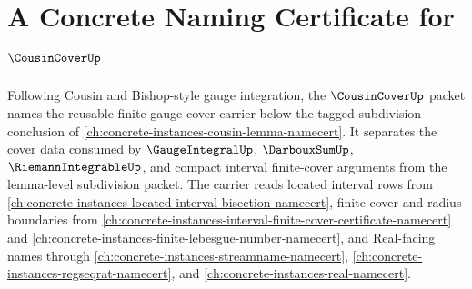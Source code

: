 \chapter{A Concrete Naming Certificate for $\CousinCoverUp$}
\label{ch:concrete-instances-cousin-cover-namecert}

Following Cousin and Bishop-style gauge integration, the $\CousinCoverUp$ packet names the reusable finite gauge-cover carrier below the tagged-subdivision conclusion of \autoref{ch:concrete-instances-cousin-lemma-namecert}. It separates the cover data consumed by $\GaugeIntegralUp$, $\DarbouxSumUp$, $\RiemannIntegrableUp$, and compact interval finite-cover arguments from the lemma-level subdivision packet. The carrier reads located interval rows from \autoref{ch:concrete-instances-located-interval-bisection-namecert}, finite cover and radius boundaries from \autoref{ch:concrete-instances-interval-finite-cover-certificate-namecert} and \autoref{ch:concrete-instances-finite-lebesgue-number-namecert}, and Real-facing names through \autoref{ch:concrete-instances-streamname-namecert}, \autoref{ch:concrete-instances-regseqrat-namecert}, and \autoref{ch:concrete-instances-real-namecert}.

